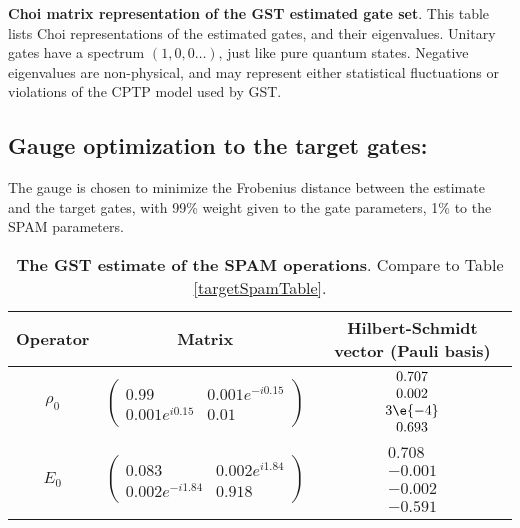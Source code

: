 {\begin{table}[h]
\begin{center}
\caption{\textbf{Choi matrix representation of the GST estimated gate set}.  This table lists Choi representations of the estimated gates, and their eigenvalues.  Unitary gates have a spectrum $(1,0,0\ldots)$, just like pure quantum states.  Negative eigenvalues are non-physical, and may represent either statistical fluctuations or violations of the CPTP model used by GST.\label{bestTargetSpamGatesetChoiTable}}
\end{center}
\end{table}

\clearpage

\subsection{Gauge optimization to the target gates:}
The gauge is chosen to minimize the Frobenius distance between the estimate and the target gates, with 99\% weight given to the gate parameters, 1\% to the SPAM parameters.


\begin{table}[h]
\begin{center}
\begin{tabular}[l]{|c|c|c|}
\hline
Operator & Matrix & Hilbert-Schmidt vector (Pauli basis) \\ \hline
$\rho_{0}$ & $ \left(\!\!\begin{array}{cc}
0.99 & 0.001e^{-i0.15} \\ 
0.001e^{i0.15} & 0.01
 \end{array}\!\!\right) $
 & $ \begin{array}{c}
0.707 \\ 
0.002 \\ 
3\e{-4} \\ 
0.693
 \end{array} $
 \\ \hline
$E_{0}$ & $ \left(\!\!\begin{array}{cc}
0.083 & 0.002e^{i1.84} \\ 
0.002e^{-i1.84} & 0.918
 \end{array}\!\!\right) $
 & $ \begin{array}{c}
0.708 \\ 
-0.001 \\ 
-0.002 \\ 
-0.591
 \end{array} $
 \\ \hline
\end{tabular}

\caption{\textbf{The GST estimate of the SPAM operations}.  Compare to Table \ref{targetSpamTable}.\label{bestTargetGatesGatesetSpamTable}}
\end{center}
\end{table}

}
